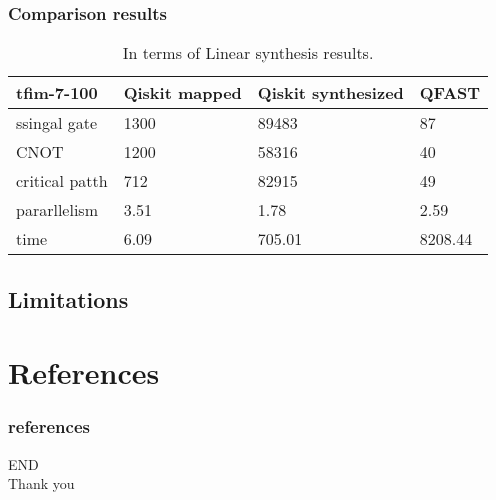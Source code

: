 \documentclass[aspectratio=1610]{beamer}
\begin{document}
\begin{frame}
  \frametitle{Comparison results}

  \begin{table}[]
    \begin{tabular}{l|lll}
    tfim-7-100  & Qiskit mapped & Qiskit synthesized & QFAST  \\\hline
    ssingal gate    & 1300          & 89483              & 87      \\
    CNOT           & 1200          & 58316              & 40      \\
    critical patth & 712           & 82915              & 49      \\
    pararllelism   & 3.51          & 1.78               & 2.59    \\
    time           & 6.09          & 705.01             & 8208.44
    \end{tabular}
    \caption{In terms of Linear synthesis results.}
    \end{table}
\end{frame}
\subsection{Limitations}

\section{References}
\begin{frame}
	\frametitle{references}
	\printbibliography
\end{frame}
\begin{frame}
  \centering
  \Huge{END\\Thank you}
\end{frame}
\end{document}
